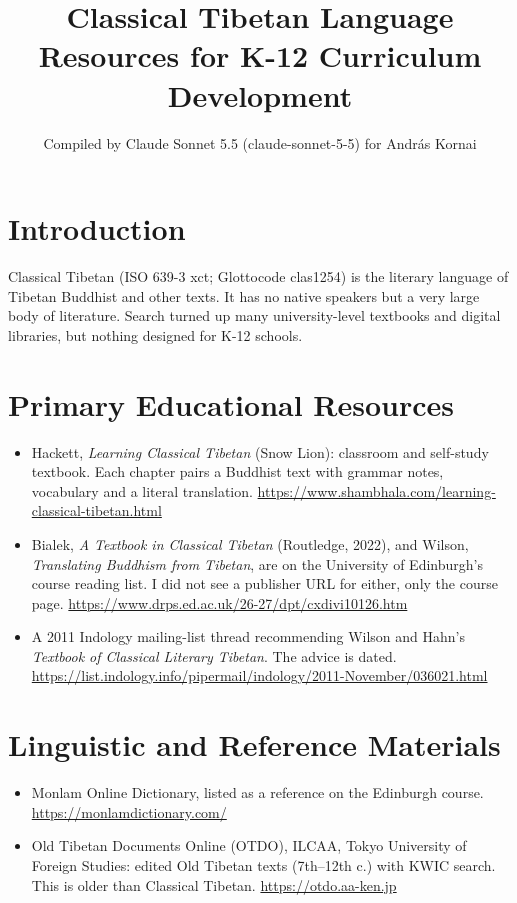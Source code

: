 \documentclass[12pt]{article}
\title{Classical Tibetan Language Resources for K-12 Curriculum Development}
\author{Compiled by Claude Sonnet 5.5 (claude-sonnet-5-5) for Andr\'as Kornai}
\date{}
\begin{document}
\maketitle

\section{Introduction}
Classical Tibetan (ISO 639-3 xct; Glottocode clas1254) is the literary language of Tibetan Buddhist and other texts. It has no native speakers but a very large body of literature. Search turned up many university-level textbooks and digital libraries, but nothing designed for K-12 schools.

\section{Primary Educational Resources}
\begin{itemize}
\item Hackett, \emph{Learning Classical Tibetan} (Snow Lion): classroom and self-study textbook. Each chapter pairs a Buddhist text with grammar notes, vocabulary and a literal translation. \url{https://www.shambhala.com/learning-classical-tibetan.html}
\item Bialek, \emph{A Textbook in Classical Tibetan} (Routledge, 2022), and Wilson, \emph{Translating Buddhism from Tibetan}, are on the University of Edinburgh's course reading list. I did not see a publisher URL for either, only the course page. \url{https://www.drps.ed.ac.uk/26-27/dpt/cxdivi10126.htm}
\item A 2011 Indology mailing-list thread recommending Wilson and Hahn's \emph{Textbook of Classical Literary Tibetan}. The advice is dated. \url{https://list.indology.info/pipermail/indology/2011-November/036021.html}
\end{itemize}

\section{Linguistic and Reference Materials}
\begin{itemize}
\item Monlam Online Dictionary, listed as a reference on the Edinburgh course. \url{https://monlamdictionary.com/}
\item Old Tibetan Documents Online (OTDO), ILCAA, Tokyo University of Foreign Studies: edited Old Tibetan texts (7th--12th c.) with KWIC search. This is older than Classical Tibetan. \url{https://otdo.aa-ken.jp}
\end{itemize}
\end{document}
